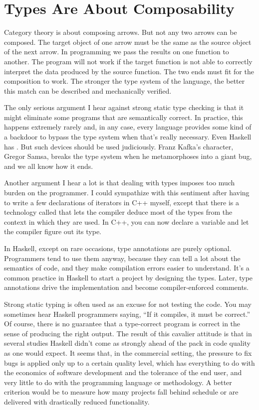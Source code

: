 \section{Types Are About Composability}

Category theory is about composing arrows. But not any two arrows can be
composed. The target object of one arrow must be the same as the source
object of the next arrow. In programming we pass the results on
one function to another. The program will not work if the target
function is not able to correctly interpret the data produced by the
source function. The two ends must fit for the composition to work. The
stronger the type system of the language, the better this match can be
described and mechanically verified.

The only serious argument I hear against strong static type checking is
that it might eliminate some programs that are semantically correct. In
practice, this happens extremely rarely and, in any case, every language
provides some kind of a backdoor to bypass the type system when that's
really necessary. Even Haskell has . But such
devices should be used judiciously. Franz Kafka's character, Gregor
Samsa, breaks the type system when he metamorphoses into a giant bug,
and we all know how it ends.

Another argument I hear a lot is that dealing with types imposes too
much burden on the programmer. I could sympathize with this sentiment
after having to write a few declarations of iterators in C++ myself,
except that there is a technology called  that lets
the compiler deduce most of the types from the context in which they are
used. In C++, you can now declare a variable  and let the
compiler figure out its type.

In Haskell, except on rare occasions, type annotations are purely
optional. Programmers tend to use them anyway, because they can tell a
lot about the semantics of code, and they make compilation errors easier
to understand. It's a common practice in Haskell to start a project by
designing the types. Later, type annotations drive the implementation
and become compiler-enforced comments.

Strong static typing is often used as an excuse for not testing the
code. You may sometimes hear Haskell programmers saying, ``If it
compiles, it must be correct.'' Of course, there is no guarantee that a
type-correct program is correct in the sense of producing the right
output. The result of this cavalier attitude is that in several studies
Haskell didn't come as strongly ahead of the pack in code quality as one
would expect. It seems that, in the commercial setting, the pressure to
fix bugs is applied only up to a certain quality level, which has
everything to do with the economics of software development and the
tolerance of the end user, and very little to do with the programming
language or methodology. A better criterion would be to measure how many
projects fall behind schedule or are delivered with drastically reduced
functionality.

